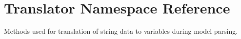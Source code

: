 \hypertarget{namespaceTranslator}{\section{\-Translator \-Namespace \-Reference}
\label{namespaceTranslator}
}


\-Methods used for translation of string data to variables during model parsing.  


